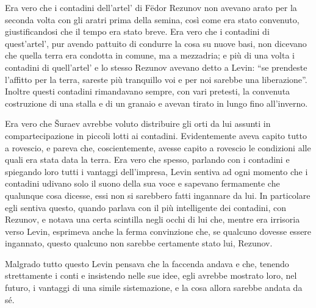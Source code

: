 Era vero che i contadini dell'artel' di Fëdor Rezunov non avevano arato per la seconda volta con gli aratri prima della semina, così come era stato convenuto, giustificandosi che il tempo era stato breve. Era vero che i contadini di quest'artel', pur avendo pattuito di condurre la cosa su nuove basi, non dicevano che quella terra era condotta in comune, ma a mezzadria; e più di una volta i contadini di quell'artel' e lo stesso Rezunov avevano detto a Levin: ``se prendeste l'affitto per la terra, sareste più tranquillo voi e per noi sarebbe una liberazione''. Inoltre questi contadini rimandavano sempre, con vari pretesti, la convenuta costruzione di una stalla e di un granaio e avevan tirato in lungo fino all'inverno. 

Era vero che Šuraev avrebbe voluto distribuire gli orti da lui assunti in compartecipazione in piccoli lotti ai contadini. Evidentemente aveva capito tutto a rovescio, e pareva che, coscientemente, avesse capito a rovescio le condizioni alle quali era stata data la terra. Era vero che spesso, parlando con i contadini e spiegando loro tutti i vantaggi dell'impresa, Levin sentiva ad ogni momento che i contadini udivano solo il suono della sua voce e sapevano fermamente che qualunque cosa dicesse, essi non si sarebbero fatti ingannare da lui. In particolare egli sentiva questo, quando parlava con il più intelligente dei contadini, con Rezunov, e notava una certa scintilla negli occhi di lui che, mentre era irrisoria verso Levin, esprimeva anche la ferma convinzione che, se qualcuno dovesse essere ingannato, questo qualcuno non sarebbe certamente stato lui, Rezunov. 

Malgrado tutto questo Levin pensava che la faccenda andava e che, tenendo strettamente i conti e insistendo nelle sue idee, egli avrebbe mostrato loro, nel futuro, i vantaggi di una simile sistemazione, e la cosa allora sarebbe andata da sé. 

